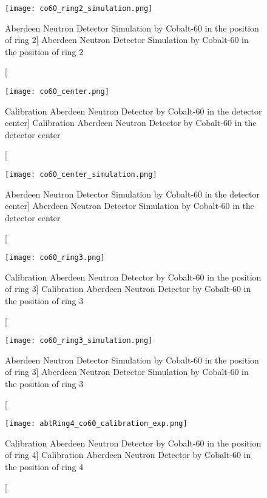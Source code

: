 \begin{figure}
    \centering
    \texttt{[image: co60\_ring2\_simulation.png]}
    \caption
    [Aberdeen Neutron Detector Simulation by Cobalt-60 in the position of ring 2]
    {Aberdeen Neutron Detector Simulation by Cobalt-60 in the position of ring 2}
    \label{fig:co60_ring2_simulation}
    \end{figure}



\begin{figure}
    \centering
    \texttt{[image: co60\_center.png]}
    \caption
    [Calibration Aberdeen Neutron Detector by Cobalt-60 in the detector center]
    {Calibration Aberdeen Neutron Detector by Cobalt-60 in the detector center}
    \label{fig:co60_ring1.png}
    \end{figure}

\begin{figure}
    \centering
    \texttt{[image: co60\_center\_simulation.png]}
    \caption
    [Aberdeen Neutron Detector Simulation by Cobalt-60 in the detector center]
    {Aberdeen Neutron Detector Simulation by Cobalt-60 in the detector center}
    \label{fig:co60_center_simulation}
    \end{figure}


\begin{figure}
    \centering
    \texttt{[image: co60\_ring3.png]}
    \caption
    [Calibration Aberdeen Neutron Detector by Cobalt-60 in the position of ring 3]
    {Calibration Aberdeen Neutron Detector by Cobalt-60 in the position of ring 3}
    \label{fig:co60_ring3.png}
    \end{figure}


\begin{figure}
    \centering
    \texttt{[image: co60\_ring3\_simulation.png]}
    \caption
    [Aberdeen Neutron Detector Simulation by Cobalt-60 in the position of ring 3]
    {Aberdeen Neutron Detector Simulation by Cobalt-60 in the position of ring 3}
    \label{fig:co60_ring3_simulation}
    \end{figure}




\begin{figure}
    \centering
    \texttt{[image: abtRing4\_co60\_calibration\_exp.png]}
    \caption
    [Calibration Aberdeen Neutron Detector by Cobalt-60 in the position of ring 4]
    {Calibration Aberdeen Neutron Detector by Cobalt-60 in the position of ring 4}
    \label{fig:abtRing4_co60_calibration_exp.png}
    \end{figure}

